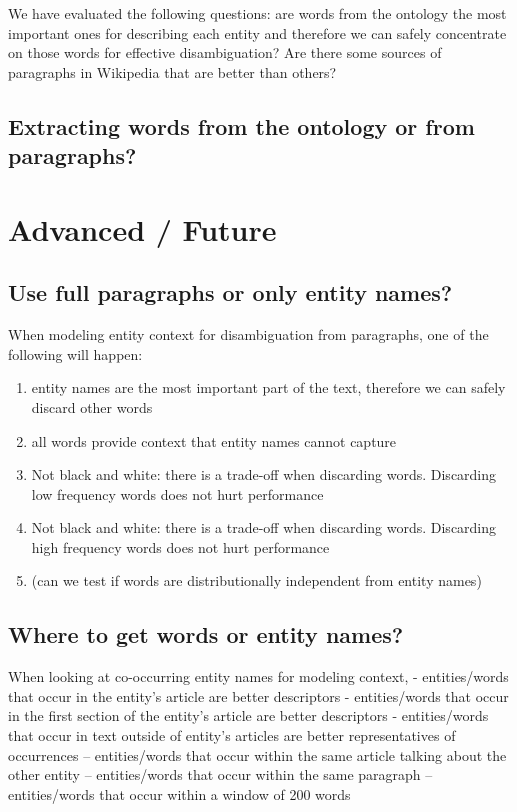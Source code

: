 \documentclass[10pt,a4paper]{article}
\begin{document}
We have evaluated the following questions: are words from the ontology the most important ones for describing each entity and therefore we can safely concentrate on those words for effective disambiguation? Are there some sources of paragraphs in Wikipedia that are better than others?

\subsection{Extracting words from the ontology or from paragraphs?}


\section{Advanced / Future}

\subsection{Use full paragraphs or only entity names?}
When modeling entity context for disambiguation from paragraphs, one of the following will happen:
\begin{enumerate}
\item entity names are the most important part of the text, therefore we can safely discard other words 
\item all words provide context that entity names cannot capture
\item Not black and white: there is a trade-off when discarding words. Discarding low frequency words does not hurt performance
\item Not black and white: there is a trade-off when discarding words. Discarding high frequency words does not hurt performance
\item (can we test if words are distributionally independent from entity names)
\end{enumerate}

\subsection{Where to get words or entity names?}
When looking at co-occurring entity names for modeling context,
- entities/words that occur in the entity's article are better descriptors
- entities/words that occur in the first section of the entity's article are better descriptors
- entities/words that occur in text outside of entity's articles are better representatives of occurrences
-- entities/words that occur within the same article talking about the other entity
-- entities/words that occur within the same paragraph
-- entities/words that occur within a window of 200 words
\end{document}
